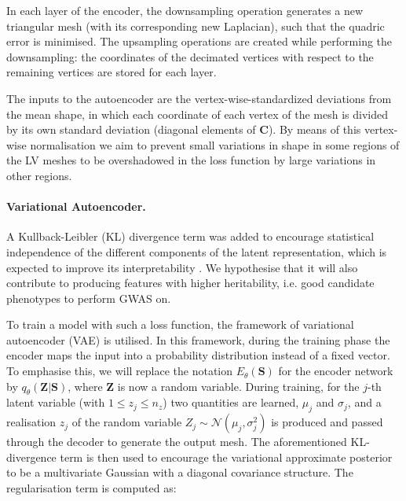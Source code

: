In each layer of the encoder, the downsampling operation generates a new triangular mesh (with its corresponding new Laplacian), such that the quadric error is minimised. The upsampling operations are created while performing the downsampling: the coordinates of the decimated vertices with respect to the remaining vertices are stored for each layer. 

The inputs to the autoencoder are the vertex-wise-standardized deviations from the mean shape, in which each coordinate of each vertex of the mesh is divided by its own standard deviation (diagonal elements of $\textbf{C}$). By means of this vertex-wise normalisation we aim to prevent small variations in shape in some regions of the LV meshes to be overshadowed in the loss function by large variations in other regions. %

\paragraph{Variational Autoencoder.} A Kullback-Leibler (KL) divergence term was added to encourage statistical independence of the different components of the latent representation, which is expected to improve its interpretability \cite{ref_betavae}. We hypothesise that it will also contribute to producing features with higher heritability, i.e. good candidate phenotypes to perform GWAS on.

To train a model with such a loss function, the framework of variational autoencoder (VAE) is utilised. In this framework, during the training phase the encoder maps the input into a probability distribution instead of a fixed vector. To emphasise this, we will replace the notation $E_\theta(\textbf{S})$ for the encoder network by $q_{\theta}(\textbf{Z}|\textbf{S})$, where $\textbf{Z}$ is now a random variable. During training, for the $j$-th latent variable (with $1\leq z_j\leq n_z$) two quantities are learned, $\mu_j$ and $\sigma_j$, and a realisation $z_j$ of the random variable $Z_j\sim\mathcal{N}(\mu_j, \sigma^2_j)$ is produced and passed through the decoder to generate the output mesh. The aforementioned KL-divergence term is then used to encourage the variational approximate posterior to be a multivariate Gaussian with a diagonal covariance structure. The regularisation term is computed as:

